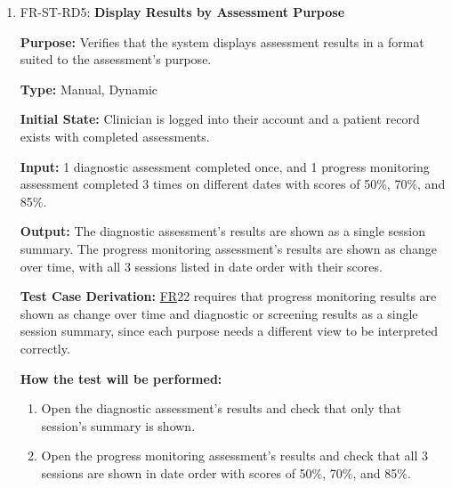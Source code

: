 \documentclass[12pt, titlepage]{article}
\newcommand{\srsfr}[1]{\href{https://github.com/Nour-Fawaz/MacaBoca/blob/main/pdfs/SRS/SRS.pdf}{FR}}
\renewcommand{\_}{\oldunderscore\allowbreak}
\begin{document}
\begin{enumerate}
  \item FR-ST-RD5: \textbf{Display Results by Assessment Purpose\\}
  \begin{mdframed}[linewidth=0.5mm]
      \textbf{Purpose:} Verifies that the system displays assessment results in a format suited to the assessment's purpose. \par
      \textbf{Type:} Manual, Dynamic \par
      \textbf{Initial State:} Clinician is logged into their account and a patient record exists with completed assessments. \par
      \textbf{Input:} 1 diagnostic assessment completed once, and 1 progress monitoring assessment completed 3 times on different dates with scores of 50\%, 70\%, and 85\%. \par
      \textbf{Output:} The diagnostic assessment's results are shown as a single session summary. The progress monitoring assessment's results are shown as change over time, with all 3 sessions listed in date order with their scores. \par
      \textbf{Test Case Derivation:} \srsfr*{22} requires that progress monitoring results are shown as change over time and diagnostic or screening results as a single session summary, since each purpose needs a different view to be interpreted correctly. \par
      \textbf{How the test will be performed:}
      \begin{enumerate}
        \item[1.] Open the diagnostic assessment's results and check that only that session's summary is shown.
        \item[2.] Open the progress monitoring assessment's results and check that all 3 sessions are shown in date order with scores of 50\%, 70\%, and 85\%.
      \end{enumerate}
  \end{mdframed}
\end{enumerate}
\end{document}
